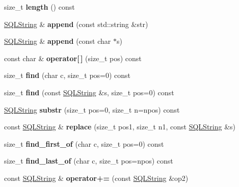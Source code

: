 \begin{DoxyCompactItemize}
size\+\_\+t {\bfseries length} () const
\item 
\hypertarget{classsql_1_1_s_q_l_string_a6877e186cc021a10a512e3446f67d7c5}{}\label{classsql_1_1_s_q_l_string_a6877e186cc021a10a512e3446f67d7c5} 
\hyperlink{classsql_1_1_s_q_l_string}{S\+Q\+L\+String} \& {\bfseries append} (const std\+::string \&str)
\item 
\hypertarget{classsql_1_1_s_q_l_string_a86b717dd5f5ca3b3117d50cd771cdf5d}{}\label{classsql_1_1_s_q_l_string_a86b717dd5f5ca3b3117d50cd771cdf5d} 
\hyperlink{classsql_1_1_s_q_l_string}{S\+Q\+L\+String} \& {\bfseries append} (const char $\ast$s)
\item 
\hypertarget{classsql_1_1_s_q_l_string_a20cfdb4b8d6b0750738606ab79619fb6}{}\label{classsql_1_1_s_q_l_string_a20cfdb4b8d6b0750738606ab79619fb6} 
const char \& {\bfseries operator\mbox{[}$\,$\mbox{]}} (size\+\_\+t pos) const
\item 
\hypertarget{classsql_1_1_s_q_l_string_a6a45c5e478b144a1d7e511d6d4040c07}{}\label{classsql_1_1_s_q_l_string_a6a45c5e478b144a1d7e511d6d4040c07} 
size\+\_\+t {\bfseries find} (char c, size\+\_\+t pos=0) const
\item 
\hypertarget{classsql_1_1_s_q_l_string_abb1323aa1f298d6550a8541f512b2a0f}{}\label{classsql_1_1_s_q_l_string_abb1323aa1f298d6550a8541f512b2a0f} 
size\+\_\+t {\bfseries find} (const \hyperlink{classsql_1_1_s_q_l_string}{S\+Q\+L\+String} \&s, size\+\_\+t pos=0) const
\item 
\hypertarget{classsql_1_1_s_q_l_string_a625fc710708a33603cb5705beea957bf}{}\label{classsql_1_1_s_q_l_string_a625fc710708a33603cb5705beea957bf} 
\hyperlink{classsql_1_1_s_q_l_string}{S\+Q\+L\+String} {\bfseries substr} (size\+\_\+t pos=0, size\+\_\+t n=npos) const
\item 
\hypertarget{classsql_1_1_s_q_l_string_aa96d107eb08a84bc6eace9a251e76bc1}{}\label{classsql_1_1_s_q_l_string_aa96d107eb08a84bc6eace9a251e76bc1} 
const \hyperlink{classsql_1_1_s_q_l_string}{S\+Q\+L\+String} \& {\bfseries replace} (size\+\_\+t pos1, size\+\_\+t n1, const \hyperlink{classsql_1_1_s_q_l_string}{S\+Q\+L\+String} \&s)
\item 
\hypertarget{classsql_1_1_s_q_l_string_ace6b7ff4e733bc4ee3f5572c9a19ee8a}{}\label{classsql_1_1_s_q_l_string_ace6b7ff4e733bc4ee3f5572c9a19ee8a} 
size\+\_\+t {\bfseries find\+\_\+first\+\_\+of} (char c, size\+\_\+t pos=0) const
\item 
\hypertarget{classsql_1_1_s_q_l_string_a9c90aefe9eec15b80b9a1dd40ce83a05}{}\label{classsql_1_1_s_q_l_string_a9c90aefe9eec15b80b9a1dd40ce83a05} 
size\+\_\+t {\bfseries find\+\_\+last\+\_\+of} (char c, size\+\_\+t pos=npos) const
\item 
\hypertarget{classsql_1_1_s_q_l_string_ad6e9824838e50e0b10bae83ead869d11}{}\label{classsql_1_1_s_q_l_string_ad6e9824838e50e0b10bae83ead869d11} 
const \hyperlink{classsql_1_1_s_q_l_string}{S\+Q\+L\+String} \& {\bfseries operator+=} (const \hyperlink{classsql_1_1_s_q_l_string}{S\+Q\+L\+String} \&op2)
\end{DoxyCompactItemize}

